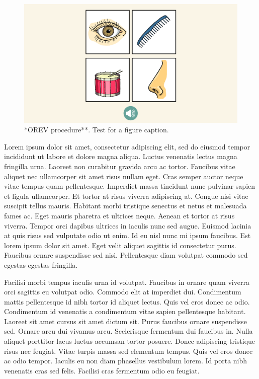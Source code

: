 \documentclass[
]{scrbook}
\begin{document}
\begin{figure}

{\centering \includegraphics[width=1\linewidth]{../figures/orev} 

}

\caption{*OREV procedure**. Test for a figure caption.}\label{fig:fig1}
\end{figure}

Lorem ipsum dolor sit amet, consectetur adipiscing elit, sed do eiusmod tempor incididunt ut labore et dolore magna aliqua. Luctus venenatis lectus magna fringilla urna. Laoreet non curabitur gravida arcu ac tortor. Faucibus vitae aliquet nec ullamcorper sit amet risus nullam eget. Cras semper auctor neque vitae tempus quam pellentesque. Imperdiet massa tincidunt nunc pulvinar sapien et ligula ullamcorper. Et tortor at risus viverra adipiscing at. Congue nisi vitae suscipit tellus mauris. Habitant morbi tristique senectus et netus et malesuada fames ac. Eget mauris pharetra et ultrices neque. Aenean et tortor at risus viverra. Tempor orci dapibus ultrices in iaculis nunc sed augue. Euismod lacinia at quis risus sed vulputate odio ut enim. Id eu nisl nunc mi ipsum faucibus. Est lorem ipsum dolor sit amet. Eget velit aliquet sagittis id consectetur purus. Faucibus ornare suspendisse sed nisi. Pellentesque diam volutpat commodo sed egestas egestas fringilla.

Facilisi morbi tempus iaculis urna id volutpat. Faucibus in ornare quam viverra orci sagittis eu volutpat odio. Commodo elit at imperdiet dui. Condimentum mattis pellentesque id nibh tortor id aliquet lectus. Quis vel eros donec ac odio. Condimentum id venenatis a condimentum vitae sapien pellentesque habitant. Laoreet sit amet cursus sit amet dictum sit. Purus faucibus ornare suspendisse sed. Ornare arcu dui vivamus arcu. Scelerisque fermentum dui faucibus in. Nulla aliquet porttitor lacus luctus accumsan tortor posuere. Donec adipiscing tristique risus nec feugiat. Vitae turpis massa sed elementum tempus. Quis vel eros donec ac odio tempor. Iaculis eu non diam phasellus vestibulum lorem. Id porta nibh venenatis cras sed felis. Facilisi cras fermentum odio eu feugiat.
\end{document}
